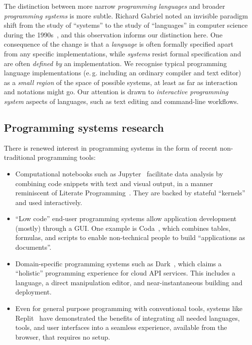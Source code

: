 \documentclass[ twoside,openright,titlepage,numbers=noenddot,headinclude,footinclude,cleardoublepage=empty,abstract=on,
                BCOR=5mm,paper=a4,fontsize=11pt
                ]{scrreprt}
\newcommand{\eg}{e.\,g.}
\providecommand{\tightlist}{}\newenvironment{longtable}[2]{\begin{tabular}}{\end{tabular}}
\theoremstyle{definition}
\begin{document}
The distinction between more narrow \emph{programming languages} and
broader \emph{programming systems} is more subtle. Richard Gabriel noted
an invisible paradigm shift from the study of ``systems'' to the study
of ``languages'' in computer science during the 1990s~\parencite{PLrev},
and this observation informs our distinction here. One consequence of
the change is that a \emph{language} is often formally specified apart
from any specific implementations, while \emph{systems} resist formal
specification and are often \emph{defined by} an implementation. We
recognise typical programming language implementations (\eg{} including
an ordinary compiler and text editor) as a \emph{small region} of the
space of possible systems, at least as far as interaction and notations
might go. Our attention is drawn to \emph{interactive programming
system} aspects of languages, such as text editing and command-line
workflows.

\hypertarget{programming-systems-research}{\subsection{Programming systems
research}\label{programming-systems-research}}

There is renewed interest in programming systems in the form of recent
non-traditional programming tools:

\begin{itemize}
\tightlist
\item
  Computational notebooks such as Jupyter~\parencite{Jupyter} facilitate
  data analysis by combining code snippets with text and visual output,
  in a manner reminiscent of Literate Programming~\parencite{LitProg}.
  They are backed by stateful ``kernels'' and used interactively.
\item
  ``Low code'' end-user programming systems allow application
  development (mostly) through a \ac{GUI}. One example is
  Coda~\parencite{CodaWeb}, which combines tables, formulas, and scripts
  to enable non-technical people to build ``applications as documents''.
\item
  Domain-specific programming systems such as Dark~\parencite{DarkWeb},
  which claims a ``holistic'' programming experience for cloud API
  services. This includes a language, a direct manipulation editor, and
  near-instantaneous building and deployment.
\item
  Even for general purpose programming with conventional tools, systems
  like Replit~\parencite{ReplitWeb} have demonstrated the benefits of
  integrating all needed languages, tools, and user interfaces into a
  seamless experience, available from the browser, that requires no
  setup.
\end{itemize}
\end{document}
